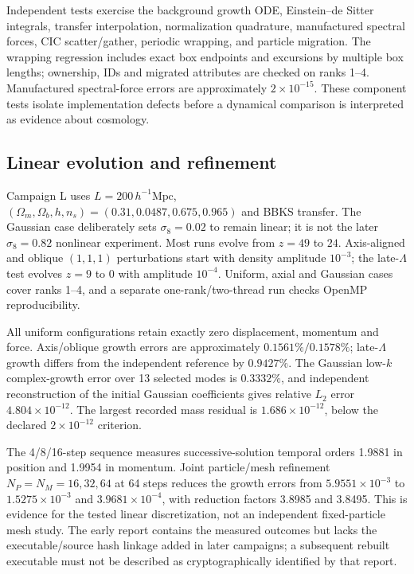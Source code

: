 Independent tests exercise the background growth ODE, Einstein--de Sitter
integrals, transfer interpolation, normalization quadrature, manufactured
spectral forces, CIC scatter/gather, periodic wrapping, and particle migration.
The wrapping regression includes exact box endpoints and excursions by multiple
box lengths; ownership, IDs and migrated attributes are checked on ranks 1--4.
Manufactured spectral-force errors are approximately $2\times10^{-15}$.
These component tests isolate implementation defects before a dynamical
comparison is interpreted as evidence about cosmology.

\subsection{Linear evolution and refinement}
\label{app:linear}

Campaign L uses $L=200\,h^{-1}\mathrm{Mpc}$,
$(\Omega_m,\Omega_b,h,n_s)=(0.31,0.0487,0.675,0.965)$ and BBKS transfer.
The Gaussian case deliberately sets $\sigma_8=0.02$ to remain linear; it is
not the later $\sigma_8=0.82$ nonlinear experiment.  Most runs evolve from
$z=49$ to $24$.  Axis-aligned and oblique $(1,1,1)$ perturbations start with
density amplitude $10^{-3}$; the late-$\Lambda$ test evolves $z=9$ to $0$
with amplitude $10^{-4}$.  Uniform, axial and Gaussian cases cover ranks 1--4,
and a separate one-rank/two-thread run checks OpenMP reproducibility.

All uniform configurations retain exactly zero displacement, momentum and
force.  Axis/oblique growth errors are approximately $0.1561\%/0.1578\%$;
late-$\Lambda$ growth differs from the independent reference by $0.9427\%$.
The Gaussian low-$k$ complex-growth error over 13 selected modes is $0.3332\%$,
and independent reconstruction of the initial Gaussian coefficients gives
relative $L_2$ error $4.804\times10^{-12}$.  The largest recorded mass residual
is $1.686\times10^{-12}$, below the declared $2\times10^{-12}$ criterion.

The 4/8/16-step sequence measures successive-solution temporal orders
1.9881 in position and 1.9954 in momentum.  Joint particle/mesh refinement
$N_P=N_M=16,32,64$ at 64 steps reduces the growth errors from
$5.9551\times10^{-3}$ to $1.5275\times10^{-3}$ and $3.9681\times10^{-4}$,
with reduction factors 3.8985 and 3.8495.  This is evidence for the tested
linear discretization, not an independent fixed-particle mesh study.
The early report contains the measured outcomes but lacks the executable/source
hash linkage added in later campaigns; a subsequent rebuilt executable must not
be described as cryptographically identified by that report.

